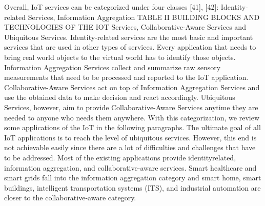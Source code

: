 Overall, IoT services can be categorized under four classes
[41], [42]: Identity-related Services, Information Aggregation
TABLE II
BUILDING BLOCKS AND TECHNOLOGIES OF THE IOT
Services, Collaborative-Aware Services and Ubiquitous Services.
Identity-related services are the most basic and important
services that are used in other types of services. Every
application that needs to bring real world objects to the virtual
world has to identify those objects. Information Aggregation
Services collect and summarize raw sensory measurements
that need to be processed and reported to the IoT application.
Collaborative-Aware Services act on top of Information Aggregation
Services and use the obtained data to make decision and
react accordingly. Ubiquitous Services, however, aim to provide
Collaborative-Aware Services anytime they are needed to anyone
who needs them anywhere. With this categorization, we review
some applications of the IoT in the following paragraphs.
The ultimate goal of all IoT applications is to reach the level of
ubiquitous services. However, this end is not achievable easily
since there are a lot of difficulties and challenges that have to be
addressed. Most of the existing applications provide identityrelated,
information aggregation, and collaborative-aware services.
Smart healthcare and smart grids fall into the information
aggregation category and smart home, smart buildings, intelligent
transportation systems (ITS), and industrial automation
are closer to the collaborative-aware category.

